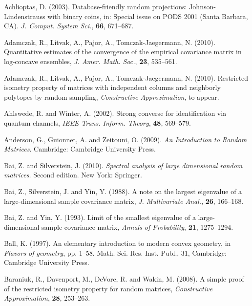 \documentclass[10pt, openany]{book}
\theoremstyle{remark}
\begin{document}
\begin{thebibliography}{}

 Achlioptas, D. (2003).
  \newblock Database-friendly random projections: Johnson-Lindenstrauss with binary coins, 
  in: Special issue on PODS 2001 (Santa Barbara, CA).
  {\em J. Comput. System Sci.}, {\bf 66}, 671--687. 

 Adamczak, R., Litvak, A., Pajor, A., Tomczak-Jaegermann, N. (2010).
  \newblock Quantitative estimates of the convergence of the empirical covariance matrix 
  in log-concave ensembles,
  {\em J. Amer. Math. Soc.}, {\bf 23}, 535--561.
  
 Adamczak, R., Litvak, A., Pajor, A., Tomczak-Jaegermann, N. (2010).
  \newblock Restricted isometry property of matrices with independent columns 
    and neighborly polytopes by random sampling, 
  {\em Constructive Approximation}, to appear.

 Ahlswede, R. and Winter, A. (2002).
  \newblock Strong converse for identification via quantum channels,
  {\em IEEE Trans. Inform. Theory}, {\bf 48}, 569--579.
  
 Anderson, G., Guionnet, A. and Zeitouni, O. (2009). 
  {\em An Introduction to Random Matrices}. 
  Cambridge: Cambridge University Press.  

  Bai, Z. and Silverstein, J. (2010).
  {\em Spectral analysis of large dimensional random matrices.} 
  Second edition. New York: Springer.

 Bai, Z., Silverstein, J. and Yin, Y. (1988).
  \newblock A note on the largest eigenvalue of a large-dimensional sample covariance matrix, 
  {\em J. Multivariate Anal.}, {\bf 26}, 166--168. 

 Bai, Z. and Yin, Y. (1993).
  \newblock Limit of the smallest eigenvalue of a large-dimensional sample covariance matrix,
  {\em Annals of Probability}, {\bf 21}, 1275--1294.

 Ball, K. (1997).
  \newblock An elementary introduction to modern convex geometry,
  in {\em Flavors of geometry}, pp. 1--58.
  Math. Sci. Res. Inst. Publ., 31, 
  Cambridge: Cambridge University Press.

 Baraniuk, R., Davenport, M., DeVore, R. and Wakin, M. (2008).
  \newblock A simple proof of the restricted isometry property for random matrices,
  {\em Constructive Approximation}, {\bf 28}, 253--263.
  

\end{thebibliography}
\end{document}
